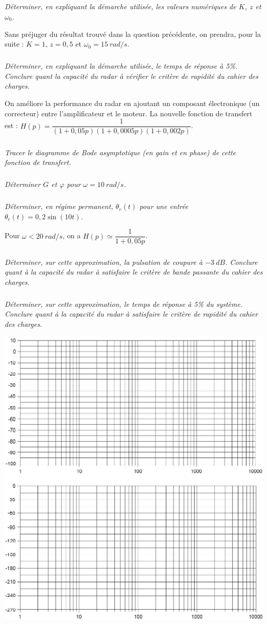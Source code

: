 \documentclass[10pt,fleqn]{article} %
\begin{document}
\begin{multicols}{2}
\subparagraph{}\textit{Déterminer, en expliquant la démarche utilisée, les valeurs numériques de $K$, $z$ et $\omega_0$.}

   Sans préjuger du résultat trouvé dans la question précédente, on prendra, pour la suite : $K = 1$, $z = 0,5$ et $\omega_0 = \SI{15}{rad/s}$.


\subparagraph{}\textit{Déterminer, en expliquant la démarche utilisée, le temps de réponse à 5\%. Conclure quant la capacité du radar à vérifier le critère de rapidité du cahier des charges. }

On améliore la performance du radar en ajoutant un composant électronique (un correcteur) entre l'amplificateur et le moteur. La nouvelle fonction de transfert est : 
$
H(p)=\dfrac{1}{\left(1+0,05p \right)\left(1+0,0005p \right)\left(1+0,002p \right)}
$.
 

\subparagraph{}\textit{Tracer le diagramme de Bode asymptotique (en gain et en phase) de cette fonction de transfert.}

\subparagraph{}\textit{Déterminer $G$ et $\varphi$ pour $\omega = \SI{10}{rad/s}$.}
\subparagraph{}\textit{Déterminer, en régime permanent, $\theta_r (t)$ pour une entrée $\theta_c (t) = 0,2 \sin(10t)$.}

Pour $\omega < \SI{20}{rad/s}$, on a $H(p)\simeq \dfrac{1}{1+0,05p}$.

\subparagraph{}\textit{Déterminer, sur cette approximation, la pulsation de coupure à $-\SI{3}{dB}$. Conclure quant à la capacité du radar à satisfaire le critère de bande passante du cahier des charges.  }

\subparagraph{}\textit{Déterminer, sur cette approximation, le temps de réponse à 5\% du système. Conclure quant à la capacité du radar à satisfaire le critère de rapidité du cahier des charges. }

\end{multicols}

\begin{center}
\includegraphics[width=\linewidth]{images/fig_04}
\end{center}
\end{document}
